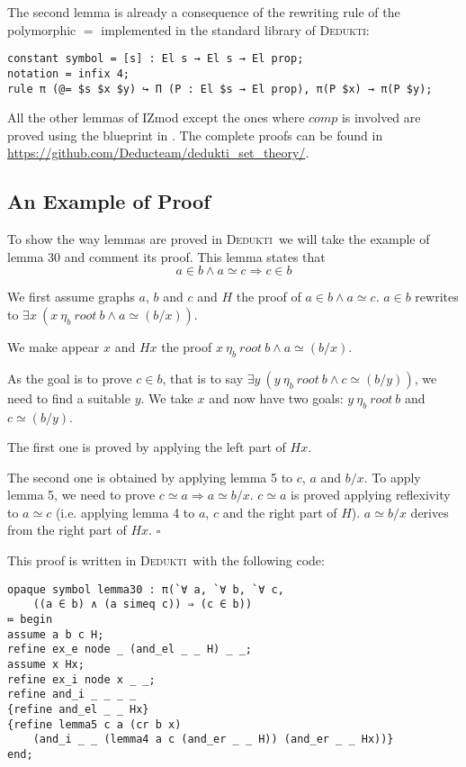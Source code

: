 \documentclass[submission,copyright,creativecommons]{eptcs}
\def\imp{\mathbin{\Rightarrow}}
\def\conj{\mathbin{\wedge}}
\def\ex{{\exists}}
\newenvironment{proof}{\noindent {\em Proof.}}{\medskip}
\newcommand{\dedukti}{\textsc{Dedukti}}
\begin{document}
The second lemma is already a consequence of the rewriting rule of the polymorphic $=$ implemented in the standard library of \dedukti: 
\begin{lstlisting}
constant symbol = [s] : El s → El s → El prop;
notation = infix 4;
rule π (@= $s $x $y) ↪ Π (P : El $s → El prop), π(P $x) → π(P $y);
\end{lstlisting}

All the other lemmas of IZmod except the ones where $comp$ is involved are proved using the blueprint in \cite[see Proposition 1]{zermodulo53}. The complete proofs can be found in \url{https://github.com/Deducteam/dedukti_set_theory/}.

\subsection{An Example of Proof}

To show the way lemmas are proved in \dedukti ~we will take the example of lemma 30 and comment its proof. This lemma states that $$ a \in b \conj a \simeq c \imp c \in b $$

\begin{proof}
We first assume graphs $a$, $b$ and $c$ and $H$ the proof of $ a \in b \conj a \simeq c $. $a \in b$ rewrites to $\ex x~(x~\eta_b~root~b \conj a \simeq (b/x))$. 

We make appear $x$ and $Hx$ the proof $x~\eta_b~root~b \conj a \simeq (b/x)$. 

As the goal is to prove $c \in b$, that is to say $\ex y~(y~\eta_b~root~b \conj c \simeq (b/y))$, we need to find a suitable $y$. We take $x$ and now have two goals: $y~\eta_b~root~b$ and $c \simeq (b/y)$. 

The first one is proved by applying the left part of $Hx$. 

The second one is obtained by applying lemma 5 to $c$, $a$ and $b/x$. To apply lemma 5, we need to prove $c \simeq a \imp a \simeq b/x$. $c \simeq a$ is proved applying reflexivity to $a \simeq c$ (i.e. applying lemma 4 to $a$, $c$ and the right part of $H$). $a \simeq b/x$ derives from the right part of $Hx$. $\square$
\end{proof}

This proof is written in \dedukti ~with the following code: 

\begin{lstlisting}
opaque symbol lemma30 : π(`∀ a, `∀ b, `∀ c, 
	((a ∈ b) ∧ (a simeq c)) ⇒ (c ∈ b))
≔ begin
assume a b c H;
refine ex_e node _ (and_el _ _ H) _ _;
assume x Hx;
refine ex_i node x _ _;
refine and_i _ _ _ _
{refine and_el _ _ Hx}
{refine lemma5 c a (cr b x) 
	(and_i _ _ (lemma4 a c (and_er _ _ H)) (and_er _ _ Hx))}
end;
\end{lstlisting}
\end{document}
